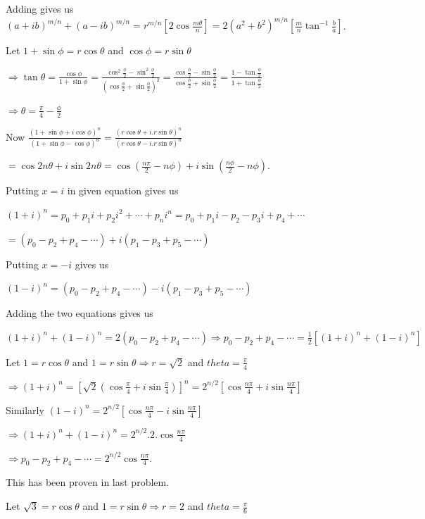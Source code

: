   Adding gives us $(a + ib)^{m/n} + (a - ib)^{m/n} = r^{m/n}\left[2\cos\frac{m\theta}{n}\right] =
  2\left(a^2 + b^2\right)^{m/n}\left[\frac{m}{n}\tan^{-1}\frac{b}{a}\right]$.
\item Let $1 + \sin\phi = r\cos\theta$ and $\cos\phi = r\sin\theta$

  $\Rightarrow \tan\theta = \frac{\cos\phi}{1 + \sin\phi} = \frac{\cos^2\frac{\phi}{2}
    - \sin^2\frac{\phi}{2}}{\left(\cos\frac{\phi}{2} + \sin\frac{\phi}{2}\right)^2}
  = \frac{\cos\frac{\phi}{2} - \sin\frac{\phi}{2}}{\cos\frac{\phi}{2} + \sin\frac{\phi}{2}} = \frac{1
    - \tan\frac{\phi}{2}}{1 + \tan\frac{\phi}{2}}$

  $\Rightarrow \theta = \frac{\pi}{4} - \frac{\phi}{2}$

  Now $\frac{(1 + \sin\phi + i\cos\phi)^n}{(1 + \sin\phi - \cos\phi)^n} = \frac{(r\cos\theta +
    i.r\sin\theta)^n}{(r\cos\theta - i.r\sin\theta)^n}$

  $= \cos2n\theta + i\sin2n\theta = \cos\left(\frac{n\pi}{2} - n\phi\right) + i\sin\left(\frac{n\phi}{2} -
  n\phi\right)$.
\item Putting $x = i$ in given equation gives us

  $(1 + i)^n = p_0 + p_1i + p_2i^2 + \cdots + p_ni^n = p_0 + p_1i - p_2 - p_3i + p_4 + \cdots$

  $= (p_0 - p_2 + p_4 - \cdots) + i(p_1 - p_3 + p_5 - \cdots)$

  Putting $x = - i$ gives us

  $(1 - i)^n = (p_0 - p_2 + p_4 - \cdots) - i(p_1 - p_3 + p_5 - \cdots)$

  Adding the two equations gives us

  $(1 + i)^n + (1 - i)^n = 2(p_0 - p_2 + p_4 - \cdots)\Rightarrow p_0 - p_2 + p_4 - \cdots = \frac{1}{2}[(1
    + i)^n + (1 - i)^n]$

  Let $1 = r\cos\theta$ and $1 = r\sin\theta \Rightarrow r = \sqrt{2}$ and $theta = \frac{\pi}{4}$

  $\Rightarrow (1 + i)^n = \left[\sqrt{2}\left(\cos\frac{\pi}{4} + i\sin\frac{\pi}{4}\right)\right]^n =
  2^{n/2}\left[\cos\frac{n\pi}{4} + i\sin\frac{n\pi}{4}\right]$

  Similarly $(1 - i)^n = 2^{n/2}\left[\cos\frac{n\pi}{4} - i\sin\frac{n\pi}{4}\right]$

  $\Rightarrow (1 + i)^n + (1 - i)^n = 2^{n/2}.2.\cos\frac{n\pi}{4}$

  $\Rightarrow p_0 - p_2 + p_4 - \cdots = 2^{n/2}\cos\frac{n\pi}{4}$.
\item This has been proven in last problem.
\item Let $\sqrt{3} = r\cos\theta$ and $1 = r\sin\theta\Rightarrow r = 2$ and $theta = \frac{\pi}{6}$

